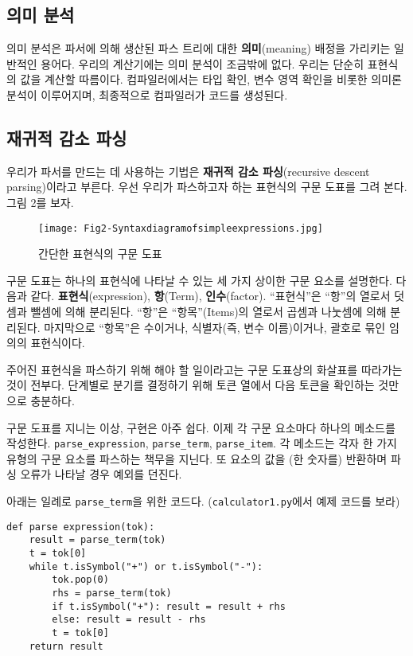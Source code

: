 \documentclass[a4paper]{oblivoir}
\begin{document}
\subsection*{의미 분석}

의미 분석은 파서에 의해 생산된 파스 트리에 대한 \textbf{의미}(meaning) 배정을 가리키는 일반적인 용어다. 우리의 계산기에는 의미 분석이 조금밖에 없다. 우리는 단순히 표현식의 값을 계산할 따름이다. 컴파일러에서는 타입 확인, 변수 영역 확인을 비롯한 의미론 분석이 이루어지며, 최종적으로 컴파일러가 코드를 생성된다.

\subsection*{재귀적 감소 파싱}

우리가 파서를 만드는 데 사용하는 기법은 \textbf{재귀적 감소 파싱}(recursive descent parsing)이라고 부른다. 우선 우리가 파스하고자 하는 표현식의 구문 도표를 그려 본다. 그림 2를 보자.

\begin{figure}[h]
    \centering
    \texttt{[image: Fig2-Syntaxdiagramofsimpleexpressions.jpg]}
    \caption{간단한 표현식의 구문 도표}
\end{figure}

구문 도표는 하나의 표현식에 나타날 수 있는 세 가지 상이한 구문 요소를 설명한다. 다음과 같다. \textbf{표현식}(expression), \textbf{항}(Term), \textbf{인수}(factor). ``표현식”은 ``항”의 열로서 덧셈과 뺄셈에 의해 분리된다. ``항”은 ``항목”(Items)의 열로서 곱셈과 나눗셈에 의해 분리된다. 마지막으로 ``항목”은 수이거나, 식별자(즉, 변수 이름)이거나, 괄호로 묶인 임의의 표현식이다.

주어진 표현식을 파스하기 위해 해야 할 일이라고는 구문 도표상의 화살표를 따라가는 것이 전부다. 단계별로 분기를 결정하기 위해 토큰 열에서 다음 토큰을 확인하는 것만으로 충분하다.

구문 도표를 지니는 이상, 구현은 아주 쉽다. 이제 각 구문 요소마다 하나의 메소드를 작성한다. \texttt{parse\_expression}, \texttt{parse\_term}, \texttt{parse\_item}. 각 메소드는 각자 한 가지 유형의 구문 요소를 파스하는 책무을 지닌다. 또 요소의 값을 (한 숫자를) 반환하며 파싱 오류가 나타날 경우 예외를 던진다.

아래는 일례로 \texttt{parse\_term}을 위한 코드다. (\texttt{calculator1.py}에서 예제 코드를 보라)

\begin{verbatim}
def parse expression(tok):
	result = parse_term(tok)
	t = tok[0]
	while t.isSymbol("+") or t.isSymbol("-"):
		tok.pop(0)
		rhs = parse_term(tok)
		if t.isSymbol("+"): result = result + rhs
		else: result = result - rhs
		t = tok[0]
	return result
\end{verbatim}
\end{document}
